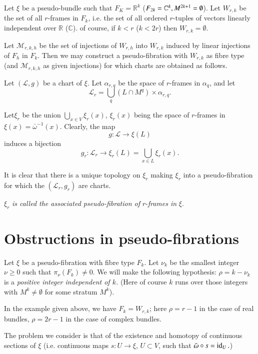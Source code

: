 Let $\xi$ be a pseudo-bundle such that $F_K = \mathbb{R}^k$
(\resp $F_{2k} =  \mathbb{C}^k, M^{2k+1}\break = \emptyset$). Let $W_{r,k}$ be
the set of all $r$-frames in $F_k$, i.e. the set of all ordered
$r$-tuples of vectors linearly independent over $\mathbb{R}$ 
(\resp $\mathbb{C}$). of course, if $k < r$ (\resp $k < 2r$) then 
$W_{r,k}=\emptyset$.   

Let $\mathscr{M}_{r,k,h}$ be the set of injections of $W_{r,h}$ into 
$W_{r,k}$ induced by linear injections of $F_h$ in $F_k$. Then we
may construct a pseudo-fibration with $W_{r,k}$ as fibre type (and
$\mathscr{M}_{r,k,h}$ as given injections) for which charts are obtained as
follows. 

Let $(\mathscr{L},g)$ be a chart of $\xi$. Let $\alpha_{r,q}$ be
the space of $r$-frames in $\alpha_q$, and let 
$$
\mathscr{L}_r = \bigcup_{q} ( L \cap M^q ) \times \alpha_{r,q}.
$$   
 
Let\pageoriginale $\xi_r$ be the union $\bigcup_{x \in V}  \xi_r
(x)$, $\xi_r(x)$  being the space of $r$-frames in
$\xi(x)=\bar{\omega}^{-1}(x)$. Clearly, the map   
$$
g:\mathscr{L} \to \xi (L) 
$$
induces a bijection 
$$ 
g_r:\mathscr{L}_r \to \xi_r(L)=\bigcup_{x \in  L}\xi_{r}(x). 
$$

It is clear that there is a unique topology on $\xi_r$ making $\xi_r$
into a pseudo-fibration for which the $(\mathscr{L}_r, g_r)$  are 
charts. 

$\xi_r$ \textit{is called the associated pseudo-fibration of}
$r$-\textit{frames in} $\xi$. 

\section{Obstructions in pseudo-fibrations}\label{chap4-sec2}


Let $\xi$ be a pseudo-fibration with fibre type $F_{k}$. Let $\nu_{k}$
be the smallest integer $\nu\geq 0$ such that $\pi_{\nu}(F_{k})\neq
0$. We will make the following hypothesis: $\rho=k-\nu_{k}$ is a {\em
  positive integer independent of $k$.} (Here of course $k$ runs over
those integers with $M^{k}\neq \emptyset$ for some stratum $M^{k}$).
    
In the example given above, we have $F_{k}=W_{r,k}$; here $\rho=r-1$
in the case of real bundles, $\rho=2r-1$ in the case of complex bundles.
    
The problem we consider is that of the existence and homotopy of
continuous sections of $\xi$ (i.e. continuous maps $s:U\to \xi$,
$U\subset V$, such that $\bar{\omega}\circ s=\operatorname{id}_{U}.$)

